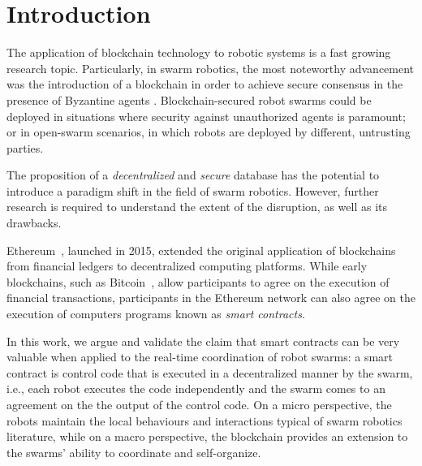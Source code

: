 \documentclass[runningheads]{llncs}
\begin{document}
\section{Introduction}
\label{sec:introduction}

The application of blockchain technology to robotic systems is a fast growing research topic. Particularly, in swarm robotics, the most noteworthy advancement was the introduction of a blockchain in order to achieve secure consensus in the presence of Byzantine agents \cite{StrCasDor2020_frontiers,pacheco_ants_2020}. Blockchain-secured robot swarms could be deployed in situations where security against unauthorized agents is paramount; or in open-swarm scenarios, in which robots are deployed by different, untrusting parties.
 
The proposition of a \emph{decentralized} and \emph{secure} database has the potential to introduce a paradigm shift in the field of swarm robotics. However, further research is required to understand the extent of the disruption, as well as its drawbacks. 

Ethereum~\cite{buterin_2014_ethereum}, launched in 2015, extended the original application of blockchains from financial ledgers to decentralized computing platforms. While early blockchains, such as Bitcoin~\cite{bitcoin_online}, allow participants to agree on the execution of financial transactions, participants in the Ethereum network can also agree on the execution of computers programs known as \emph{smart contracts}. 
 
In this work, we argue and validate the claim that smart contracts can be very valuable when applied to the real-time coordination of robot swarms: a smart contract is control code that is executed in a decentralized manner by the swarm, i.e., each robot executes the code independently and the swarm comes to an agreement on the the output of the control code. On a micro perspective, the robots maintain the local behaviours and interactions typical of swarm robotics literature, while on a macro perspective, the blockchain provides an extension to the swarms' ability to coordinate and self-organize. 

\end{document}

